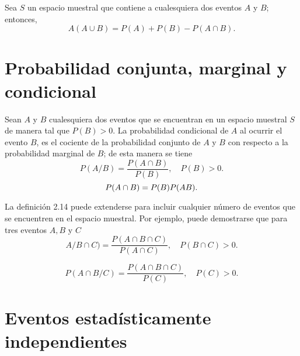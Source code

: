 \begin{teo} Sea $S$ un espacio muestral que contiene a cualesquiera dos eventos $A$ y $B$; entonces,
    $$A(A\cup B) = P(A) + P(B) - P(A\cap B).$$
\end{teo}

\section{Probabilidad conjunta, marginal y condicional}

\begin{tcolorbox}[colframe = white]
    \begin{def.} Sean $A$ y $B$ cualesquiera dos eventos que se encuentran en un espacio muestral $S$ de manera tal que $P(B)>0$. La probabilidad condicional de $A$ al ocurrir el evento $B$, es el cociente de la probabilidad conjunto de $A$ y $B$ con respecto a la probabilidad marginal de $B$; de esta manera se tiene
	\begin{equation}
	    P(A/B) = \dfrac{P(A\cap B)}{P(B)}, \quad P(B)>0.
	\end{equation}
	\begin{equation}
	    P(A\cap B) = P(B)P(A\/B).
	\end{equation}
    \end{def.}
\end{tcolorbox}

La definición 2.14 puede extenderse para incluir cualquier número de eventos que se encuentren en el espacio muestral. Por ejemplo, puede demostrarse que para tres eventos $A,B$ y $C$
\begin{equation}
    A/B\cap C) = \dfrac{P(A\cap B \cap C)}{P(A\cap C)}, \quad P(B\cap C)>0.
\end{equation}

\begin{equation}
    P(A\cap B / C) = \dfrac{P(A\cap B \cap C)}{P(C)}, \quad P(C)>0.
\end{equation}

\section{Eventos estadísticamente independientes}
